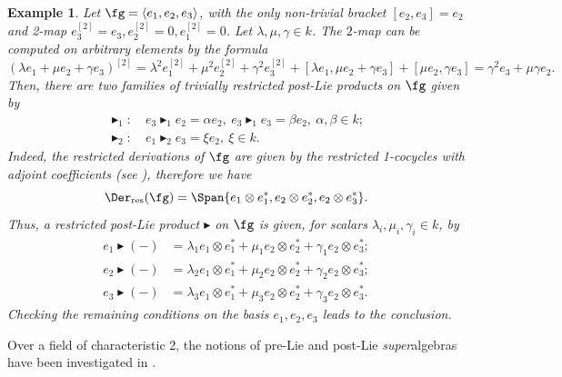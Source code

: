 \documentclass[12pt]{article}
\newcommand{\btr}{\blacktriangleright}
\newtheorem{example}[theorem]{Example}
\begin{document}
\begin{example} Let $\fg=\langle e_1,e_2,e_3\rangle$, with the only non-trivial bracket $[e_2,e_3]=e_2$ and 2-map $e_3^{[2]}=e_3, e_2^{[2]} = 0, e_1^{[2]} = 0$. Let $\lambda,\mu,\gamma\in k$. The $2$-map can be computed on arbitrary elements by the formula
            $$(\lambda e_1+\mu e_2+\gamma e_3)^{[2]}=\lambda^2e_1^{[2]}+\mu^2e_2^{[2]}+\gamma^2e_3^{[2]}+[\lambda e_1,\mu e_2+\gamma e_3]+[\mu e_2,\gamma e_3]=\gamma^2e_3+\mu\gamma e_2.$$         
Then, there are two families of trivially restricted post-Lie products on $\fg$ given by
            \begin{align*}
            \btr_1:&~e_3\btr_1e_2=\alpha e_2,~e_3\btr_1e_3=\beta e_2,~ \alpha,\beta\in k;\\
             \btr_2:&~e_1\btr_2e_3=\xi e_2,~\xi\in k.
            \end{align*}
        Indeed, the restricted derivations of $\fg$ are given by the restricted 1-cocycles with adjoint coefficients (see \cite{EF}), therefore we have
        \begin{equation}
            \Der_{\rm res}(\fg)=\Span\{e_1\otimes e_1^*,e_2\otimes e_2^*,e_2\otimes e_3^*\}.
        \end{equation}
        Thus, a restricted post-Lie product $\btr$ on $\fg$ is given, for scalars $\lambda_i,\mu_i,\gamma_i\in k$, by
        \begin{align*}
            e_1\btr(-)&=\lambda_1e_1\otimes e_1^*+\mu_1e_2\otimes e_2^*+\gamma_1e_2\otimes e_3^*;\\
            e_2\btr(-)&=\lambda_2e_1\otimes e_1^*+\mu_2e_2\otimes e_2^*+\gamma_2e_2\otimes e_3^*;\\
            e_3\btr(-)&=\lambda_3e_1\otimes e_1^*+\mu_3e_2\otimes e_2^*+\gamma_3e_2\otimes e_3^*.
        \end{align*}
        Checking the remaining conditions on the basis $e_1,e_2,e_3$ leads to the conclusion.
\end{example}

Over a field of characteristic 2, the notions of pre-Lie and post-Lie \textit{super}algebras have been investigated in \cite{BBE}.
\end{document}

